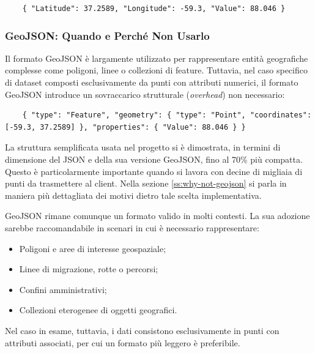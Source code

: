 \begin{listing}
  [H]
  \caption{Formato semplificato JSON}
  \label{lst:simplified_json_format} %
  \begin{verbatim}
    { "Latitude": 37.2589, "Longitude": -59.3, "Value": 88.046 }
  \end{verbatim}
\end{listing}

\subsubsection{GeoJSON: Quando e Perché Non Usarlo}

Il formato GeoJSON è largamente utilizzato per rappresentare entità geografiche
complesse come poligoni, linee o collezioni di feature. Tuttavia, nel caso specifico
di dataset composti esclusivamente da punti con attributi numerici, il formato
GeoJSON introduce un sovraccarico strutturale (\textit{overhead}) non necessario:

\begin{listing}
  [H]
  \caption{Struttura GeoJSON equivalente}
  \label{lst:geojson_equivalent_structure} %
  \begin{verbatim}
    { "type": "Feature", "geometry": { "type": "Point", "coordinates": [-59.3, 37.2589] }, "properties": { "Value": 88.046 } }
  \end{verbatim}
\end{listing}

La struttura semplificata usata nel progetto si è dimostrata, in termini di dimensione
del JSON e della sua versione GeoJSON, fino al 70\% più compatta. Questo è
particolarmente importante quando si lavora con decine di migliaia di punti da
trasmettere al client. Nella sezione \ref{ss:why-not-geojson} si parla in maniera
più dettagliata dei motivi dietro tale scelta implementativa.

GeoJSON rimane comunque un formato valido in molti contesti. La sua adozione
sarebbe raccomandabile in scenari in cui è necessario rappresentare:

\begin{itemize}
  \item Poligoni e aree di interesse geospaziale;

  \item Linee di migrazione, rotte o percorsi;

  \item Confini amministrativi;

  \item Collezioni eterogenee di oggetti geografici.
\end{itemize}

\noindent
Nel caso in esame, tuttavia, i dati consistono esclusivamente in punti con attributi
associati, per cui un formato più leggero è preferibile.

\newpage